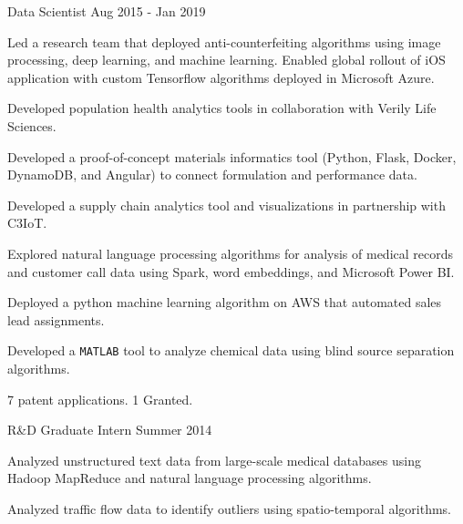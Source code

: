 \begin{cventries}
  \cventry
    {Data Scientist} %
    {} %
    {} %
    {Aug 2015 - Jan 2019} %
    {
      \begin{cvitems} %
      \item {Led a research team that deployed anti-counterfeiting algorithms using image
          processing, deep learning, and machine learning. Enabled global
          rollout of iOS application with custom Tensorflow algorithms deployed in
          Microsoft Azure.}
        \item {Developed population health analytics tools in collaboration with Verily 
            Life Sciences.}
        \item {Developed a proof-of-concept materials informatics tool (Python, Flask,
            Docker, DynamoDB, and Angular) to connect formulation and performance data.}
        \item {Developed a supply chain analytics tool and visualizations in partnership
            with C3IoT.}
        \item {Explored natural language processing algorithms for analysis of medical
            records and customer call data using Spark, word embeddings, and
            Microsoft Power BI.}
        \item {Deployed a python machine learning algorithm on AWS that automated sales
            lead assignments.}
        \item {Developed a {\texttt{MATLAB}} tool to analyze chemical data using blind source
            separation algorithms.}
        \item {7 patent applications. 1 Granted.}
      \end{cvitems}
    }

  \cventry
    {R\&D Graduate Intern} %
    {} %
    {} %
    {Summer 2014} %
    {
      \begin{cvitems} %
      \item {Analyzed unstructured text data from large-scale medical
        databases using Hadoop MapReduce and natural language processing
        algorithms.}
      \item {Analyzed traffic flow data to identify outliers using spatio-temporal
        algorithms.}
      \end{cvitems}
    }


\end{cventries}
